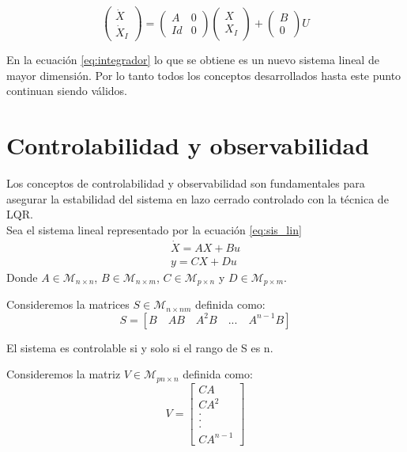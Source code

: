 \documentclass[main]{subfiles}
\begin{document}
\begin{equation}
\label{eq:integrador}
\left(\begin{array}{c}
\dot{X}\\
\dot{X}_I
\end{array}\right) = \left( \begin{array}{cc}
A & 0\\
Id & 0
\end{array}\right)\left(\begin{array}{c}
X\\
X_I
\end{array}\right) + \left(\begin{array}{c}
B\\
0
\end{array}\right)U
\end{equation}  
 
En la ecuaci\'on \ref{eq:integrador} lo que se obtiene es un nuevo sistema lineal de mayor dimensi\'on. Por lo tanto todos los conceptos desarrollados hasta este punto continuan siendo v\'alidos. 
 
\section{Controlabilidad y observabilidad}

Los conceptos de controlabilidad y observabilidad son fundamentales para asegurar la estabilidad del sistema en lazo cerrado controlado con la t\'ecnica de LQR.\\

Sea el sistema lineal representado por la ecuaci\'on \ref{eq:sis_lin}
\begin{equation}
\label{eq:sis_lin}
\begin{array}{c}
\dot{X} = AX+Bu \\
y = CX+Du
\end{array}
\end{equation}
Donde $A \in \mathcal{M}_{n \times n}$, $B \in \mathcal{M}_{n \times m}$, $C \in \mathcal{M}_{p \times n}$ y $D \in \mathcal{M}_{p \times m}$. 

Consideremos la matrices $S\in \mathcal{M}_{n \times nm}$  definida como:
\begin{equation}
\label{eq:contr}
S = [B \quad AB \quad A^2B \quad ...\quad A^{n-1}B]
\end{equation}

El sistema es controlable si y solo si el rango de S es n. 

Consideremos la matriz $V\in \mathcal{M}_{pn \times n}$ definida como:
\begin{equation}
\label{eq:obs}
V=
\left[
\begin{array}{c}
 CA\\
CA^2\\
.\\
.\\
.\\
CA^{n-1}
\end{array}\right]
\end{equation}
\end{document}
